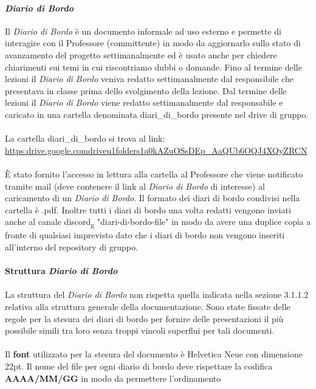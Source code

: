 \paragraph{\textit{Diario di Bordo}}
Il \textit{Diario di Bordo} è un documento informale ad uso esterno e permette di interagire con il Professore (committente) in modo da aggiornarlo sullo stato di avanzamento del progetto settimanalmente ed è usato 
anche per chiedere chiarimenti sui temi in cui riscontriamo dubbi o domande.
Fino al termine delle lezioni il \textit{Diario di Bordo} veniva redatto settimanalmente dal responsibile che presentava in classe prima dello svolgimento 
della lezione.
Dal termine delle lezioni il \textit{Diario di Bordo} viene redatto settimanalmente dal responsabile e caricato in una cartella denominata diari\_di\_bordo presente nel drive di gruppo.
\\\\
La cartella diari\_di\_bordo si trova al link: \href{https://drive.google.com/drive/u/1/folders/1a0kAZuOSsDEp_AaQUb6OQJ4XQyZ--RCN}{\\https:\/\/drive.google.com\/drive\/u\/1\/folders\/1a0kAZuOSsDEp\_AaQUb6OQJ4XQyZ\-\-RCN}
\\\\
È stato fornito l'accesso in lettura alla cartella al Professore che viene notificato tramite mail (deve contenere il link al \textit{Diario di Bordo} di interesse) al caricamento di un \textit{Diario di Bordo}.
Il formato dei diari di bordo condivisi nella cartella è .pdf.
Inoltre tutti i diari di bordo una volta redatti vengono inviati anche al canale discord\textsubscript{g} "diari-di-bordo-file" in modo da avere una duplice copia a fronte di 
qualsiasi imprevisto dato che i diari di bordo non vengono inseriti all'interno del repository di gruppo.
\\\\
\textbf{Struttura \textit{Diario di Bordo}} 
\\\\
La struttura del \textit{Diario di Bordo} non rispetta quella indicata nella sezione 3.1.1.2 relativa alla struttura generale della documentazione.
Sono state fissate delle regole per la stesura dei diari di bordo per fornire delle presentazioni il più possibile simili tra loro 
senza troppi vincoli superflui per tali documenti.
\\\\
Il \textbf{font} utilizzato per la stesura del documento è Helvetica Neue con dimensione 22pt.
Il nome del file per ogni diario di bordo deve rispettare la codifica \textbf{AAAA/MM/GG} in modo da permettere l'ordinamento
